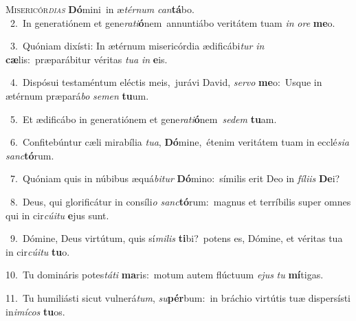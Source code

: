 \lettrine{\initial\textcolor{\initialcolor}{M}}{isericór\-\textit{di}\-\textit{as}} \textbf{Dó}\-mini~\star in æ\-\textit{tér}\-\textit{num} \textit{can}\-\textbf{tá}bo.\\
{\numbfont\textcolor{\numbcolor}{~2.}}~In generatiónem et gene\-\textit{ra}\-\textit{ti}\textbf{ó}nem~\star annuntiábo veritátem tuam \textit{in} \textit{o}\-\textit{re} \textbf{me}\-o.\par
{\numbfont\textcolor{\numbcolor}{~3.}}~Quóniam dixísti: In ætérnum misericórdia ædificábi\textit{tur} \textit{in} \textbf{cæ}\-lis:~\star præparábitur véritas \textit{tu}\-\textit{a} \textit{in} \textbf{e}\-is.\par
{\numbfont\textcolor{\numbcolor}{~4.}}~Dispósui testaméntum eléctis meis,~\dagger jurávi David, \textit{ser}\-\textit{vo} \textbf{me}\-o:~\star Usque in ætérnum præpará\textit{bo} \textit{se}\-\textit{men} \textbf{tu}\-um.\par
{\numbfont\textcolor{\numbcolor}{~5.}}~Et ædificábo in generatiónem et gene\-\textit{ra}\-\textit{ti}\textbf{ó}nem~\star \textit{se}\-\textit{dem} \textbf{tu}\-am.\par
{\numbfont\textcolor{\numbcolor}{~6.}}~Confitebúntur cæli mirabília \textit{tu}\-\textit{a}, \textbf{Dó}\-mine,~\star étenim veritátem tuam in ecclé\-\textit{si}\-\textit{a} \textit{sanc}\-\textbf{tó}rum.\par
{\numbfont\textcolor{\numbcolor}{~7.}}~Quóniam quis in núbibus æquá\-\textit{bi}\-\textit{tur} \textbf{Dó}\-mino:~\star símilis erit Deo in \textit{fí}\-\textit{li}\textit{is} \textbf{De}\-i?\par
{\numbfont\textcolor{\numbcolor}{~8.}}~Deus, qui glorificátur in consíli\textit{o} \textit{sanc}\-\textbf{tó}rum:~\star magnus et terríbilis super omnes qui in cir\-\textit{cú}\-\textit{i}\textit{tu} \textbf{e}\-jus sunt.\par
{\numbfont\textcolor{\numbcolor}{~9.}}~Dómine, Deus virtútum, quis sí\-\textit{mi}\-\textit{lis} \textbf{ti}\-bi?~\star potens es, Dómine, et véritas tua in cir\-\textit{cú}\-\textit{i}\textit{tu} \textbf{tu}\-o.\par
{\numbfont\textcolor{\numbcolor}{10.}}~Tu domináris potes\-\textit{tá}\-\textit{ti} \textbf{ma}\-ris:~\star motum autem flúctuum \textit{e}\-\textit{jus} \textit{tu} \textbf{mí}\-tigas.\par
{\numbfont\textcolor{\numbcolor}{11.}}~Tu humiliásti sicut vulnerá\-\textit{tum}\-, \textit{su}\-\textbf{pér}bum:~\star in bráchio virtútis tuæ dispersísti in\-\textit{i}\-\textit{mí}\textit{cos} \textbf{tu}\-os.\par
